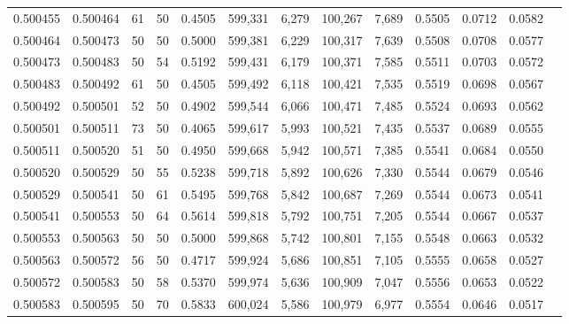 \begin{tabular}{rrrrrrrrrrrrr}
0.500455 & 0.500464 &    61 &  50 &                                     0.4505 & 599,331 &   6,279 & 100,267 &   7,689 & 0.5505 & 0.0712 & 0.0582 \\
0.500464 & 0.500473 &    50 &  50 &                                     0.5000 & 599,381 &   6,229 & 100,317 &   7,639 & 0.5508 & 0.0708 & 0.0577 \\
0.500473 & 0.500483 &    50 &  54 &                                     0.5192 & 599,431 &   6,179 & 100,371 &   7,585 & 0.5511 & 0.0703 & 0.0572 \\
0.500483 & 0.500492 &    61 &  50 &                                     0.4505 & 599,492 &   6,118 & 100,421 &   7,535 & 0.5519 & 0.0698 & 0.0567 \\
0.500492 & 0.500501 &    52 &  50 &                                     0.4902 & 599,544 &   6,066 & 100,471 &   7,485 & 0.5524 & 0.0693 & 0.0562 \\
0.500501 & 0.500511 &    73 &  50 &                                     0.4065 & 599,617 &   5,993 & 100,521 &   7,435 & 0.5537 & 0.0689 & 0.0555 \\
0.500511 & 0.500520 &    51 &  50 &                                     0.4950 & 599,668 &   5,942 & 100,571 &   7,385 & 0.5541 & 0.0684 & 0.0550 \\
0.500520 & 0.500529 &    50 &  55 &                                     0.5238 & 599,718 &   5,892 & 100,626 &   7,330 & 0.5544 & 0.0679 & 0.0546 \\
0.500529 & 0.500541 &    50 &  61 &                                     0.5495 & 599,768 &   5,842 & 100,687 &   7,269 & 0.5544 & 0.0673 & 0.0541 \\
0.500541 & 0.500553 &    50 &  64 &                                     0.5614 & 599,818 &   5,792 & 100,751 &   7,205 & 0.5544 & 0.0667 & 0.0537 \\
0.500553 & 0.500563 &    50 &  50 &                                     0.5000 & 599,868 &   5,742 & 100,801 &   7,155 & 0.5548 & 0.0663 & 0.0532 \\
0.500563 & 0.500572 &    56 &  50 &                                     0.4717 & 599,924 &   5,686 & 100,851 &   7,105 & 0.5555 & 0.0658 & 0.0527 \\
0.500572 & 0.500583 &    50 &  58 &                                     0.5370 & 599,974 &   5,636 & 100,909 &   7,047 & 0.5556 & 0.0653 & 0.0522 \\
0.500583 & 0.500595 &    50 &  70 &                                     0.5833 & 600,024 &   5,586 & 100,979 &   6,977 & 0.5554 & 0.0646 & 0.0517 \\

\end{tabular}

